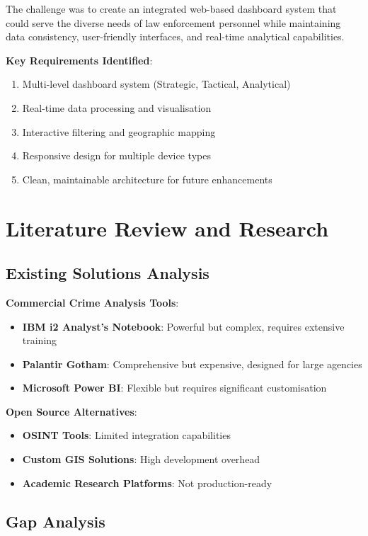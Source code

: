 \documentclass[12pt,a4paper]{article}
\begin{document}
The challenge was to create an integrated web-based dashboard system that could serve the diverse needs of law enforcement personnel while maintaining data consistency, user-friendly interfaces, and real-time analytical capabilities.

\textbf{Key Requirements Identified}:
\begin{enumerate}
    \item Multi-level dashboard system (Strategic, Tactical, Analytical)
    \item Real-time data processing and visualisation
    \item Interactive filtering and geographic mapping
    \item Responsive design for multiple device types
    \item Clean, maintainable architecture for future enhancements
\end{enumerate}

\section{Literature Review and Research}

\subsection{Existing Solutions Analysis}

\textbf{Commercial Crime Analysis Tools}:
\begin{itemize}
    \item \textbf{IBM i2 Analyst's Notebook}: Powerful but complex, requires extensive training
    \item \textbf{Palantir Gotham}: Comprehensive but expensive, designed for large agencies
    \item \textbf{Microsoft Power BI}: Flexible but requires significant customisation
\end{itemize}

\textbf{Open Source Alternatives}:
\begin{itemize}
    \item \textbf{OSINT Tools}: Limited integration capabilities
    \item \textbf{Custom GIS Solutions}: High development overhead
    \item \textbf{Academic Research Platforms}: Not production-ready
\end{itemize}

\subsection{Gap Analysis}
\end{document}
